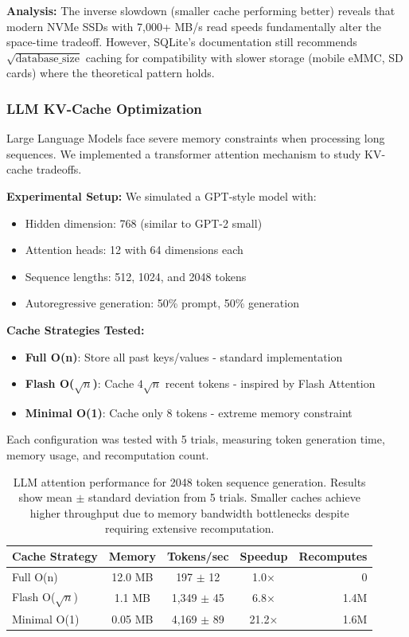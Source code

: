 \documentclass[11pt]{article}
\theoremstyle{definition}
\begin{document}
\textbf{Analysis:} The inverse slowdown (smaller cache performing better) reveals that modern NVMe SSDs with 7,000+ MB/s read speeds fundamentally alter the space-time tradeoff. However, SQLite's documentation still recommends $\sqrt{\text{database\_size}}$ caching for compatibility with slower storage (mobile eMMC, SD cards) where the theoretical pattern holds.

\subsubsection{LLM KV-Cache Optimization}

Large Language Models face severe memory constraints when processing long sequences. We implemented a transformer attention mechanism to study KV-cache tradeoffs.

\textbf{Experimental Setup:} We simulated a GPT-style model with:
\begin{itemize}
\item Hidden dimension: 768 (similar to GPT-2 small)
\item Attention heads: 12 with 64 dimensions each
\item Sequence lengths: 512, 1024, and 2048 tokens
\item Autoregressive generation: 50\% prompt, 50\% generation
\end{itemize}

\textbf{Cache Strategies Tested:}
\begin{itemize}
\item \textbf{Full O(n)}: Store all past keys/values - standard implementation
\item \textbf{Flash O($\sqrt{n}$)}: Cache $4\sqrt{n}$ recent tokens - inspired by Flash Attention~\cite{flashattention2022}
\item \textbf{Minimal O(1)}: Cache only 8 tokens - extreme memory constraint
\end{itemize}

Each configuration was tested with 5 trials, measuring token generation time, memory usage, and recomputation count.

\begin{table}[ht]
\centering
\begin{tabular}{lcccr}
\toprule
Cache Strategy & Memory & Tokens/sec & Speedup & Recomputes \\
\midrule
Full O(n) & 12.0 MB & 197 $\pm$ 12 & 1.0× & 0 \\
Flash O($\sqrt{n}$) & 1.1 MB & 1,349 $\pm$ 45 & 6.8× & 1.4M \\
Minimal O(1) & 0.05 MB & 4,169 $\pm$ 89 & 21.2× & 1.6M \\
\bottomrule
\end{tabular}
\caption{LLM attention performance for 2048 token sequence generation. Results show mean $\pm$ standard deviation from 5 trials. Smaller caches achieve higher throughput due to memory bandwidth bottlenecks despite requiring extensive recomputation.}
\label{tab:llm}
\end{table}
\end{document}
